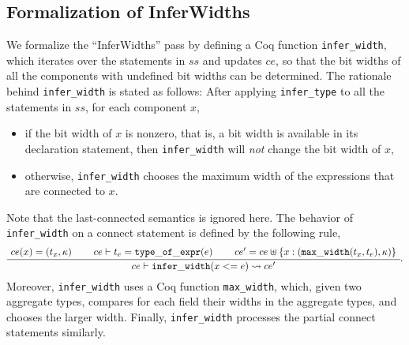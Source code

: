 \subsection{Formalization of InferWidths}
We formalize the ``InferWidths'' pass by defining a Coq function {\tt infer\_width}, which iterates over the statements in $ss$ and updates $ce$, so that the bit widths of all the components with undefined bit widths can be determined. 
The rationale behind {\tt infer\_width} is stated as follows: After applying {\tt infer\_type} to all the statements in $ss$, for each component $x$,
\begin{itemize}
\item if the bit width of $x$ is nonzero, that is, a bit width is available in its declaration statement, then {\tt infer\_width} will \emph{not} change the bit width of $x$,
%
\item otherwise, {\tt infer\_width} chooses the maximum width of the expressions that are connected to $x$. 
\end{itemize}
Note that the last-connected semantics is ignored here. The behavior of {\tt infer\_width} on a connect statement is defined by the following rule, 
%
  \begin{gather}
    \inferiii[]
    {\seqq{ce \vdash {\tt infer\_width }(x<=e) \rightsquigarrow ce'}}
    {\seqq{ce(x) =  (t_x, \kappa)}}
    {\seqq{ce \vdash t_e = {\tt type\_of\_expr }(e)}}
    {\seqq{ce' = ce \uplus \{x : ({\tt max\_width }(t_x, t_e), \kappa)\}}}.
    \end{gather}
Moreover, {\tt infer\_width} uses a Coq function {\tt max\_width}, which, given two aggregate types, compares for each field their widths in the aggregate types, and chooses the larger width.
Finally, {\tt infer\_width} processes the partial connect statements similarly. 

